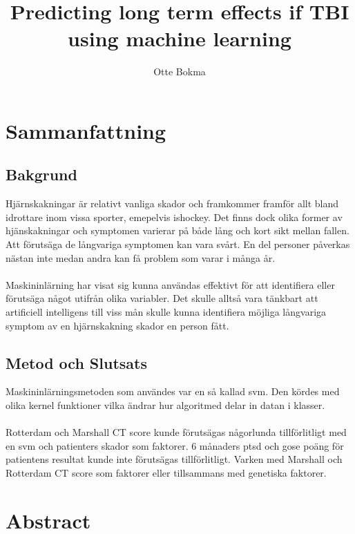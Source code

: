 \documentclass[11pt]{article}
\title{Predicting long term effects if TBI using machine learning}
\author{Otte Bokma}
\begin{document}
\begin{titlepage}
\maketitle
\end{titlepage}

\section*{Sammanfattning}

\subsection*{Bakgrund}

Hjärnskakningar är relativt vanliga skador och framkommer framför allt bland idrottare inom vissa sporter, emepelvis ishockey. Det finns dock olika former av hjänskakningar och symptomen varierar på både lång och kort sikt mellan fallen. Att förutsäga de långvariga symptomen kan vara svårt. En del personer påverkas nästan inte medan andra kan få problem som varar i många år.\\
\\
Maskininlärning har visat sig kunna användas effektivt för att identifiera eller förutsäga något utifrån olika variabler. Det skulle alltså vara tänkbart att artificiell intelligens till viss mån skulle kunna identifiera möjliga långvariga symptom av en hjärnskakning skador en person fått.

\subsection*{Metod och Slutsats}
Maskininlärningsmetoden som användes var en så kallad \gls{svm}. Den kördes med olika kernel funktioner vilka ändrar hur algoritmed delar in datan i klasser.\\
\\
Rotterdam och Marshall CT score kunde förutsägas någorlunda tillförlitligt med en \gls{svm} och patienters skador som faktorer. 6 månaders \gls{ptsd} och \gls{gose} poäng för patientens resultat kunde inte förutsägas tillförlitligt. Varken med Marshall och Rotterdam CT score som faktorer eller tillsammans med genetiska faktorer.

\section*{Abstract}
\end{document}
